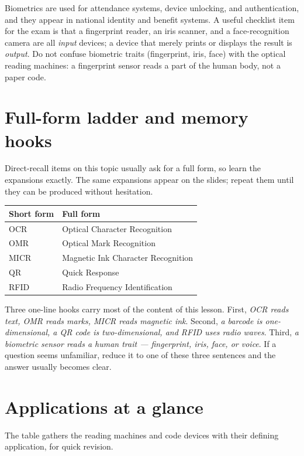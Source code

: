 \documentclass[11pt]{article}
\begin{document}
Biometrics are used for attendance systems, device unlocking, and
authentication, and they appear in national identity and benefit systems. A
useful checklist item for the exam is that a fingerprint reader, an iris
scanner, and a face-recognition camera are all \emph{input} devices; a device
that merely prints or displays the result is \emph{output}. Do not confuse
biometric traits (fingerprint, iris, face) with the optical reading machines:
a fingerprint sensor reads a part of the human body, not a paper code.

\section{Full-form ladder and memory hooks}
Direct-recall items on this topic usually ask for a full form, so learn the
expansions exactly. The same expansions appear on the slides; repeat them
until they can be produced without hesitation.

\begin{center}
\begin{tabular}{p{}p{}}
\toprule
\textbf{Short form} & \textbf{Full form} \\
\midrule
OCR & Optical Character Recognition \\
OMR & Optical Mark Recognition \\
MICR & Magnetic Ink Character Recognition \\
QR & Quick Response \\
RFID & Radio Frequency Identification \\
\bottomrule
\end{tabular}
\end{center}

Three one-line hooks carry most of the content of this lesson. First,
\emph{OCR reads text, OMR reads marks, MICR reads magnetic ink}. Second,
\emph{a barcode is one-dimensional, a QR code is two-dimensional, and RFID
uses radio waves}. Third, \emph{a biometric sensor reads a human trait ---
fingerprint, iris, face, or voice}. If a question seems unfamiliar, reduce
it to one of these three sentences and the answer usually becomes clear.

\section{Applications at a glance}
The table gathers the reading machines and code devices with their defining
application, for quick revision.
\end{document}
